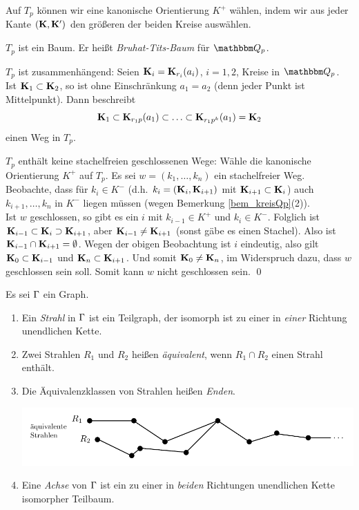 \documentclass[a4paper, 12pt, twoside]{article}
\begin{document}
Auf $T_p$ können wir eine kanonische Orientierung $K^+$ wählen,
indem wir aus jeder Kante $(\mathbf{K},\mathbf{K}')$ den größeren der beiden Kreise
auswählen.

\BEM $T_p$ ist ein Baum. Er heißt \emph{Bruhat-Tits-Baum}
für $\QQ_p$.

\bew $T_p$ ist zusammenhängend: Seien $\mathbf{K}_i=\mathbf{K}_{r_i}(a_i)$, $i=1,2$,
Kreise in $\QQ_p$. Ist $\mathbf{K}_1\subset \mathbf{K}_2$, so ist ohne Einschränkung
$a_1=a_2$ (denn jeder Punkt ist Mittelpunkt). Dann beschreibt
\[
\mathbf{K}_1 \subset \mathbf{K}_{r_1 p}(a_1) \subset \ldots \subset
\mathbf{K}_{r_1 p^k}(a_1)=\mathbf{K}_2
\]
einen Weg in $T_p$.

$T_p$ enthält keine stachelfreien geschlossenen Wege: Wähle die
kanonische Orientierung $K^+$ auf $T_p$.
Es sei $w=(k_1,\ldots,k_n)$ ein stachelfreier Weg.
Beobachte, dass für $k_i\in K^-$ (d.h. $k_i=(\mathbf{K}_i,\mathbf{K}_{i+1})$
mit $\mathbf{K}_{i+1} \subset \mathbf{K}_i$) auch $k_{i+1},\ldots,k_n$ in $K^-$
liegen müssen (wegen Bemerkung \ref{bem_kreisQp}(2)).\\
Ist $w$ geschlossen, so gibt es ein $i$ mit $k_{i-1}\in K^+$ und
$k_i\in K^-$.
Folglich ist $\mathbf{K}_{i-1}\subset \mathbf{K}_i \supset \mathbf{K}_{i+1}$, aber
$\mathbf{K}_{i-1}\neq\mathbf{K}_{i+1}$ (sonst gäbe es einen Stachel).
Also ist $\mathbf{K}_{i-1}\cap \mathbf{K}_{i+1}=\emptyset$. Wegen der obigen
Beobachtung ist $i$ eindeutig, also gilt
$\mathbf{K}_0\subset \mathbf{K}_{i-1}$ und $\mathbf{K}_n\subset \mathbf{K}_{i+1}$.
Und somit $\mathbf{K}_0\neq \mathbf{K}_n$, im Widerspruch dazu, dass $w$ geschlossen
sein soll. Somit kann $w$ nicht geschlossen sein.
\qed

\DEF Es sei $\Gamma$ ein Graph.
\begin{enumerate}
\item Ein \emph{Strahl} in $\Gamma$ ist ein Teilgraph,
der isomorph ist zu einer in \textsl{einer} Richtung unendlichen
Kette.
\item Zwei Strahlen $R_1$ und $R_2$ heißen \emph{äquivalent},
wenn $R_1\cap R_2$ einen Strahl enthält.
\item Die Äquivalenzklassen von Strahlen heißen \emph{Enden}.
\begin{center}
	\includegraphics{grugraImages/R1R2}
\end{center}
\item Eine \emph{Achse} von $\Gamma$ ist ein
zu einer in \textsl{beiden} Richtungen unendlichen Kette isomorpher
Teilbaum.
\end{enumerate}
\end{document}
